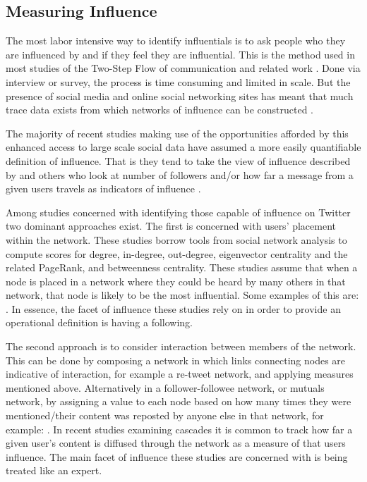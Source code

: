 \documentclass[a4paper,12pt]{article}
\begin{document}
\subsection{Measuring Influence}

The most labor intensive way to identify influentials is to ask people who they are influenced by and if they feel they are influential. This is the method used in most studies of the Two-Step Flow of communication and related work \cite{katz}. Done via interview or survey, the process is time consuming and limited in scale. But the presence of social media and online social networking sites has meant that much trace data exists from which networks of influence can be constructed \cite{WelserSmithGleaveFisher2008}.

The majority of recent studies making use of the opportunities afforded by this enhanced access to large scale social data have assumed a more easily quantifiable definition of influence. That is they tend to take the view of influence described by \cite{rogers4th} and others who look at number of followers and/or how far a message from a given users travels as indicators of influence \cite{Bakshy, WuHofmanMasonWatts2011, Ye2010, Rattanaritnont2012}. 

Among studies concerned with identifying those capable of influence on Twitter two dominant approaches exist. The first is concerned with users' placement within the network. These studies borrow tools from social network analysis to compute scores for degree, in-degree, out-degree, eigenvector centrality and the related PageRank, and betweenness centrality. These studies assume that when a node is placed in a network where they could be heard by many others in that network, that node is likely to be the most influential. Some examples of this are: \cite{Bakshy, Brown2010, Anger2011, Ye2010, WuHofmanMasonWatts2011, Bigonha2011, WeitzelQuaresmadeOliveira2012, Subbian2011}. In essence, the facet of influence these studies rely on in order to provide an operational definition is having a following.

The second approach is to consider interaction between members of the network. This can be done by composing a network in which links connecting nodes are indicative of interaction, for example a re-tweet network, and applying measures mentioned above. Alternatively in a follower-followee network, or mutuals network, by assigning a value to each node based on how many times they were mentioned/their content was reposted by anyone else in that network, for example: \cite{Sousa, Overbey2013}. In recent studies examining cascades it is common to track how far a given user's content is diffused through the network as a measure of that users influence. The main facet of influence these studies are concerned with is being treated like an expert.
\end{document}
